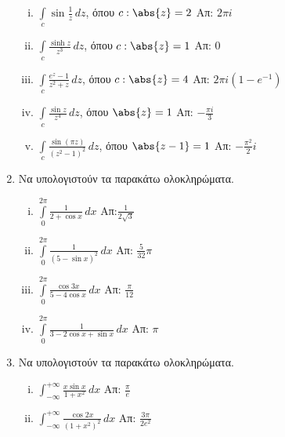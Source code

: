 \begin{enumerate}
    \begin{enumerate}[i)]
      \item $\int\limits_c\sin \frac{1}{z}\,dz$, \quad όπου $c:\abs{z}=2$ 
        \hfill Απ: $2\pi i$
      \item $\int\limits_c\frac{\sinh z}{z^3}\,dz$, \quad όπου $c:\abs{z}=1$ 
        \hfill Απ: $0$
      \item $\int\limits_c\frac{e^z-1}{z^2+z}\,dz$, \quad όπου $c:\abs{z}=4$ 
        \hfill Απ: $2\pi i(1-e^{-1})$
      \item $ \int \limits_{c} \frac{\sin{z}}{z^{4}} \,{dz} $, \quad όπου $ \abs{z}
        =1 $ \hfill Απ: $ - \frac{\pi i}{3} $ 
      \item $ \int \limits_{c} \frac{\sin{(\pi z)}}{(z^{2}-1)^{2}} \,{dz} $, \quad 
        όπου $ \abs{z-1} = 1 $
        \hfill Απ: $ - \frac{\pi ^{2}}{2} i $  
    \end{enumerate}

  \item Να υπολογιστούν τα παρακάτω ολοκληρώματα.

    \begin{enumerate}[i)]
      \item $\int\limits_0^{2\pi}\frac{1}{2+\cos x}\,dx$ \hfill Απ:$\frac{1}{2\sqrt{3}}$
      \item $\int\limits_0^{2\pi}\frac{1}{(5-\sin x)^2}\,dx$ \hfill Απ: $\frac{5}{32}\pi$
      \item $\int\limits_0^{2\pi}\frac{\cos 3x}{5-4\cos x}\,dx$ 
        \hfill Απ: $\frac{\pi}{12}$
      \item $\int\limits_0^{2\pi}\frac{1}{3-2\cos x+\sin x}\,dx$ \hfill Απ: $\pi$
    \end{enumerate}

  \item Να υπολογιστούν τα παρακάτω ολοκληρώματα.

    \begin{enumerate}[i)]
      \item $\int_{-\infty}^{+\infty}\frac{x\sin x}{1+x^2}\,dx$ 
        \hfill  Απ: $\frac{\pi}{e}$
      \item $\int_{-\infty}^{+\infty}\frac{\cos 2x}{(1+x^2)^2}\,dx$ 
        \hfill  Απ: $\frac{3\pi}{2e^2}$
    \end{enumerate}
\end{enumerate}


